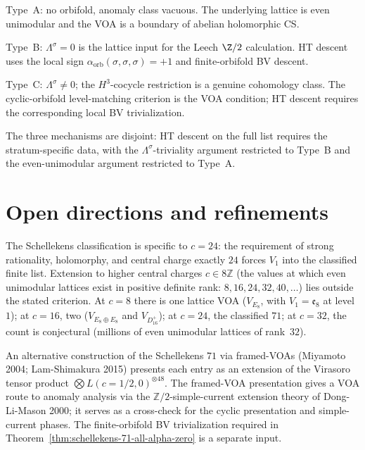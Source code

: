 \begin{remark}
\label{rem:schellekens-three-mechanisms}
Type~A: no orbifold, anomaly class vacuous. The underlying lattice is
even unimodular and the VOA is a boundary of abelian holomorphic CS.

Type~B: $\Lambda^\sigma = 0$ is the lattice input for the Leech
$\Z/2$ calculation. HT descent uses the local sign
$\alpha_{\mathrm{orb}}(\sigma,\sigma,\sigma)=+1$ and finite-orbifold
BV descent.

Type~C: $\Lambda^\sigma \ne 0$; the $H^3$-cocycle restriction is a
genuine cohomology class. The cyclic-orbifold level-matching criterion
is the VOA condition; HT descent requires the corresponding local
BV trivialization.

The three mechanisms are disjoint: HT descent on the full list requires
the stratum-specific data, with the
$\Lambda^\sigma$-triviality argument restricted to Type~B and the
even-unimodular argument restricted to Type~A.
\end{remark}

\section{Open directions and refinements}
\label{sec:schellekens-71-open-directions}

\begin{remark}[Beyond $c = 24$: arithmetic constraint]
\label{rem:schellekens-beyond-c24}
The Schellekens classification is specific to $c = 24$: the
requirement of strong rationality, holomorphy, and central charge exactly
$24$ forces $V_1$ into the classified finite list. Extension to
higher central charges $c \in 8\mathbb{Z}$ (the values at which even
unimodular lattices exist in positive definite rank:
$8, 16, 24, 32, 40, \ldots$) lies outside the stated criterion.
At $c = 8$ there is one lattice VOA ($V_{E_8}$, with
$V_1 = \mathfrak{e}_8$ at level~$1$); at $c = 16$, two
($V_{E_8 \oplus E_8}$ and $V_{D_{16}^+}$); at $c = 24$, the classified
$71$; at $c = 32$, the count is conjectural (millions of even
unimodular lattices of rank~$32$).
\end{remark}

\begin{remark}
\label{rem:schellekens-framed-voa-crosscheck}
An alternative construction of the Schellekens $71$ via
framed-VOAs (Miyamoto 2004; Lam-Shimakura 2015) presents each entry
as an extension of the Virasoro tensor product
$\bigotimes L(c = 1/2, 0)^{\otimes 48}$. The framed-VOA presentation
gives a VOA route to anomaly analysis via the
$\mathbb{Z}/2$-simple-current extension theory of Dong-Li-Mason 2000;
it serves as a cross-check for the cyclic presentation and
simple-current phases. The finite-orbifold BV trivialization required
in Theorem~\ref{thm:schellekens-71-all-alpha-zero} is a separate
input.
\end{remark}

